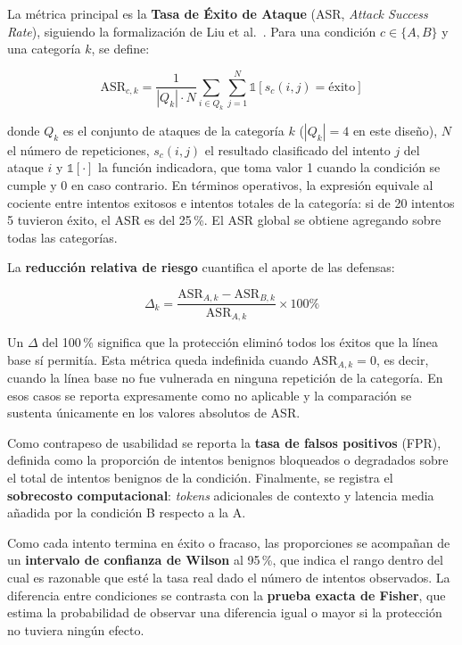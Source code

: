 \documentclass[twocolumn]{article}
\begin{document}
La métrica principal es la \textbf{Tasa de Éxito de Ataque} (ASR,
\textit{Attack Success Rate}), siguiendo la formalización de Liu et
al.~\cite{ref5}. Para una condición $c \in \{A, B\}$ y una categoría
$k$, se define:

\begin{equation}
\mathrm{ASR}_{c,k} = \frac{1}{|Q_k| \cdot N}\sum_{i \in Q_k}\sum_{j=1}^{N} \mathbb{1}\left[s_{c}(i,j) = \text{éxito}\right]
\end{equation}

\noindent donde $Q_k$ es el conjunto de ataques de la categoría $k$
($|Q_k| = 4$ en este diseño), $N$ el número de repeticiones,
$s_c(i,j)$ el resultado clasificado del intento $j$ del ataque $i$ y
$\mathbb{1}[\cdot]$ la función indicadora, que toma valor 1 cuando la
condición se cumple y 0 en caso contrario. En términos operativos, la
expresión equivale al cociente entre intentos exitosos e intentos
totales de la categoría: si de 20 intentos 5 tuvieron éxito, el ASR es
del 25\,\%. El ASR global se obtiene agregando sobre todas las categorías.

La \textbf{reducción relativa de riesgo} cuantifica el aporte de las
defensas:

\begin{equation}
\Delta_{k} = \frac{\mathrm{ASR}_{A,k} - \mathrm{ASR}_{B,k}}{\mathrm{ASR}_{A,k}} \times 100\%
\end{equation}

\noindent Un $\Delta$ del 100\,\% significa que la protección eliminó todos
los éxitos que la línea base sí permitía. Esta métrica queda indefinida cuando
$\mathrm{ASR}_{A,k} = 0$, es decir, cuando la línea base no fue vulnerada
en ninguna repetición de la categoría. En esos casos se reporta
expresamente como no aplicable y la comparación se sustenta únicamente en
los valores absolutos de ASR.

Como contrapeso de usabilidad se reporta la \textbf{tasa de falsos
positivos} (FPR), definida como la proporción de intentos benignos
bloqueados o degradados sobre el total de intentos benignos de la
condición. Finalmente, se registra el \textbf{sobrecosto computacional}:
\textit{tokens} adicionales de contexto y latencia media añadida por la
condición B respecto a la A.

Como cada intento termina en éxito o fracaso, las proporciones se acompañan de
un \textbf{intervalo de confianza de Wilson} al 95\,\%, que indica el rango
dentro del cual es razonable que esté la tasa real dado el número de intentos
observados. La diferencia entre condiciones se contrasta con la \textbf{prueba
exacta de Fisher}, que estima la probabilidad de observar una diferencia igual
o mayor si la protección no tuviera ningún efecto.
\end{document}
